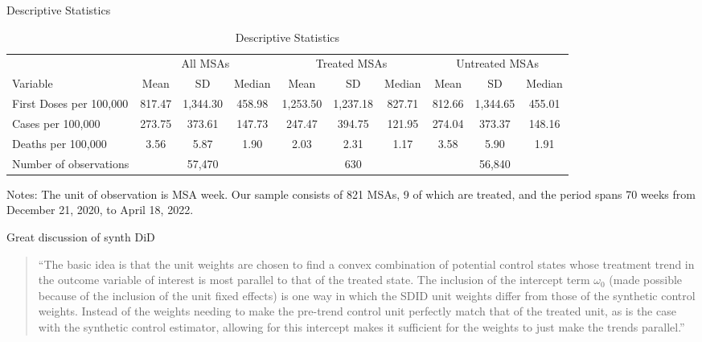 \documentclass{beamer}
\begin{document}
\begin{frame}[shrink=20]{Descriptive Statistics}

\begin{table}[ht]
\centering \tiny
\caption{Descriptive Statistics}
\begin{tabular}{lccccccccc}
\toprule\toprule
 & \multicolumn{3}{c}{All MSAs} & \multicolumn{3}{c}{Treated MSAs} & \multicolumn{3}{c}{Untreated MSAs} \\ \cmidrule(lr){2-4} \cmidrule(lr){5-7} \cmidrule(lr){8-10}
Variable              & Mean & SD & Median & Mean & SD & Median & Mean & SD & Median \\ \midrule
First Doses per 100,000  & 817.47 & 1,344.30 & 458.98 & 1,253.50 & 1,237.18 & 827.71 & 812.66 & 1,344.65 & 455.01 \\
Cases per 100,000        & 273.75 & 373.61 & 147.73 & 247.47 & 394.75 & 121.95 & 274.04 & 373.37 & 148.16 \\
Deaths per 100,000       & 3.56 & 5.87 & 1.90 & 2.03 & 2.31 & 1.17 & 3.58 & 5.90 & 1.91 \\
Number of observations  & & 57,470 & & & 630 & & & 56,840 & \\ \bottomrule\bottomrule
\end{tabular}
\tiny \newline Notes: The unit of observation is MSA week. Our sample consists of 821 MSAs, 9 of which are treated, and the period spans 70 weeks from December 21, 2020, to April 18, 2022.
\end{table}

\end{frame}


\begin{frame}{Great discussion of synth DiD}


\begin{quote}
``The basic idea is that the unit weights are chosen to find a convex combination of potential control states whose treatment trend in the outcome variable of interest is most parallel to that of the treated state.  The inclusion of the intercept term $\omega_0$ (made possible because of the inclusion of the unit fixed effects) is one way in which the SDID unit weights differ from those of the synthetic control weights.  Instead of the weights needing to make the pre-trend control unit perfectly match that of the treated unit, as is the case with the synthetic control estimator, allowing for this intercept makes it sufficient for the weights to just make the trends parallel.''
\end{quote}

\end{frame}
\end{document}
